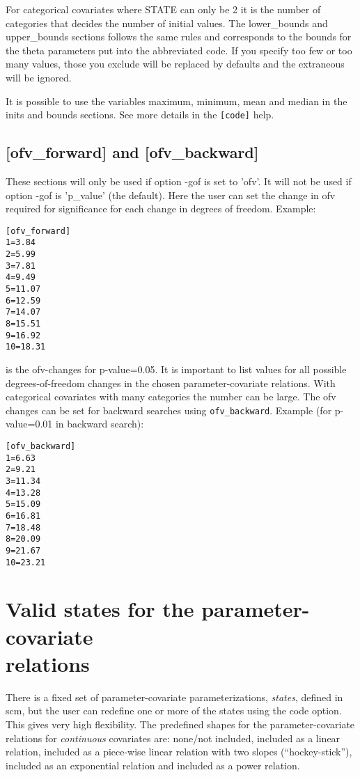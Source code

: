 For categorical covariates where STATE can only be 2 it is the number of categories that decides the number of initial values. The lower\_bounds and upper\_bounds sections follows the same rules and corresponds to the bounds for the theta parameters put into the abbreviated code. If you specify too few or too many values, those you exclude will be replaced by defaults and the extraneous will be ignored. 

It is possible to use the variables maximum, minimum, mean and median in the inits and bounds sections. See more details in the \verb|[code]| help. 

\subsection{[ofv\_forward] and [ofv\_backward]}
These sections will only be used if option -gof is set to 'ofv'. It will not be used if option -gof is 'p\_value' (the default). Here the user can set the change in ofv required for significance for each change in degrees of freedom.
\newpage
Example:
\begin{verbatim}
[ofv_forward]
1=3.84
2=5.99
3=7.81
4=9.49
5=11.07
6=12.59
7=14.07
8=15.51
9=16.92
10=18.31
\end{verbatim}
is the ofv-changes for p-value=0.05. It is important to list values for all possible degrees-of-freedom changes in the chosen parameter-covariate relations. With categorical covariates with many categories the number can be large. The ofv changes can be set for backward searches using \verb|ofv_backward|. Example (for p-value=0.01 in backward search):
\begin{verbatim}
[ofv_backward]
1=6.63
2=9.21
3=11.34
4=13.28
5=15.09
6=16.81
7=18.48
8=20.09
9=21.67
10=23.21
\end{verbatim}

\section{Valid states for the parameter-covariate\\relations}
There is a fixed set of parameter-covariate parameterizations, \emph{states}, defined in scm, but the user can redefine one or more of the states using the code option. This gives very high flexibility. The predefined shapes for the 
parameter-covariate relations for \emph{continuous} covariates are: none/not included, included as a linear relation, included as a piece-wise linear relation with two slopes (“hockey-stick”), included as an exponential relation and included as a power relation. 


